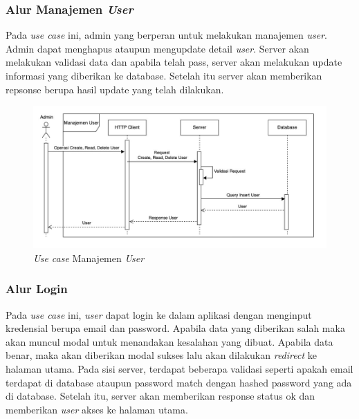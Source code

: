 \subsubsection{Alur Manajemen \textit{User}}

Pada \textit{use case} ini, admin yang berperan untuk melakukan manajemen \textit{user}. Admin dapat menghapus ataupun mengupdate detail \textit{user}. Server akan melakukan validasi data dan apabila telah pass, server akan melakukan update informasi yang diberikan ke database. Setelah itu server akan memberikan repsonse berupa hasil update yang telah dilakukan.

\begin{figure}[ht]
  \centering
  \includegraphics[width=1\textwidth]{resources/chapter-3/usecase/uc-04.jpg}
  \caption{\textit{Use case} Manajemen \textit{User}}
  \label{fig:usecase-04}
\end{figure}

\subsubsection{Alur Login}

Pada \textit{use case} ini, \textit{user} dapat login ke dalam aplikasi dengan menginput kredensial berupa email dan password. Apabila data yang diberikan salah maka akan muncul modal untuk menandakan kesalahan yang dibuat. Apabila data benar, maka akan diberikan modal sukses lalu akan dilakukan \textit{redirect} ke halaman utama. Pada sisi server, terdapat beberapa validasi seperti apakah email terdapat di database ataupun password match dengan hashed password yang ada di database. Setelah itu, server akan memberikan response status ok dan memberikan \textit{user} akses ke halaman utama.

